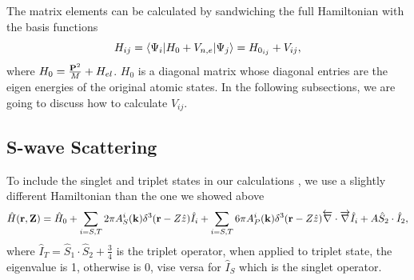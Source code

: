 \documentclass[british,english]{article}
\numberwithin{equation}{section}
\numberwithin{figure}{section}
\begin{document}
The matrix elements can be calculated by sandwiching the full Hamiltonian with the basis functions
\begin{equation}
H_{ij}=\braket{\Psi_i|H_0+V_{n,e}|\Psi_j}=H_{0_{ij}}+V_{ij},
\end{equation}
where $H_0 =\frac{{\bf P}^{2}}{M}+H_{el}$. $H_0$ is a diagonal matrix whose diagonal entries are the eigen energies of the original atomic states. In the following subsections, we are going to discuss how to calculate $V_{ij}$.
\subsection{S-wave Scattering}
To include the singlet and triplet states in our calculations \cite{Anderson2014}, we use a slightly different Hamiltonian than the one we showed above
\begin{equation}
\hat H({\bf r, Z})=\hat H_0+\sum_{i=S,T}2\pi A^i_S({\bf k})\delta^3({\bf r}-Z\hat z)\hat I_i+\sum_{i=S,T}6\pi A_P^i({\bf k})\delta^3({\bf r}-Z\hat z)\overleftarrow{\nabla}\cdot\overrightarrow\nabla\hat I_i+A\hat S_2\cdot \hat I_2,
\end{equation}
 where $\hat I_T=\hat S_1\cdot \hat S_2+\frac 34$ is the triplet operator, when applied to triplet state, the eigenvalue is 1, otherwise is 0, vise versa for $\hat I_S$ which is the singlet operator.
\end{document}
